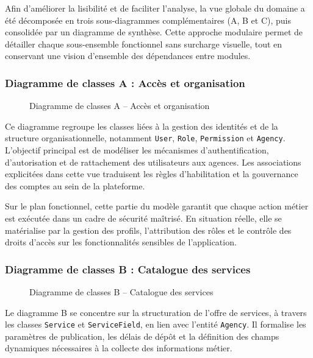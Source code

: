 Afin d'améliorer la lisibilité et de faciliter l'analyse, la vue globale du domaine a été décomposée en trois sous-diagrammes complémentaires (A, B et C), puis consolidée par un diagramme de synthèse. Cette approche modulaire permet de détailler chaque sous-ensemble fonctionnel sans surcharge visuelle, tout en conservant une vision d'ensemble des dépendances entre modules.

\newpage
\subsubsection{Diagramme de classes A : Accès et organisation}

\begin{figure}[H]
  \centering
  
  \caption{Diagramme de classes A -- Accès et organisation}
  \label{fig:dclass_a}
\end{figure}

Ce diagramme regroupe les classes liées à la gestion des identités et de la structure organisationnelle, notamment \texttt{User}, \texttt{Role}, \texttt{Permission} et \texttt{Agency}. L'objectif principal est de modéliser les mécanismes d'authentification, d'autorisation et de rattachement des utilisateurs aux agences. Les associations explicitées dans cette vue traduisent les règles d'habilitation et la gouvernance des comptes au sein de la plateforme.

Sur le plan fonctionnel, cette partie du modèle garantit que chaque action métier est exécutée dans un cadre de sécurité maîtrisé. En situation réelle, elle se matérialise par la gestion des profils, l'attribution des rôles et le contrôle des droits d'accès sur les fonctionnalités sensibles de l'application.

\newpage
\subsubsection{Diagramme de classes B : Catalogue des services}

\begin{figure}[H]
  \centering
  
  \caption{Diagramme de classes B -- Catalogue des services}
  \label{fig:dclass_b}
\end{figure}

Le diagramme B se concentre sur la structuration de l'offre de services, à travers les classes \texttt{Service} et \texttt{ServiceField}, en lien avec l'entité \texttt{Agency}. Il formalise les paramètres de publication, les délais de dépôt et la définition des champs dynamiques nécessaires à la collecte des informations métier.

